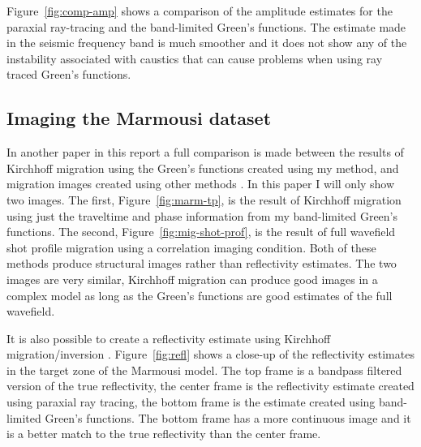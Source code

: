 
Figure~\ref{fig:comp-amp} shows a comparison of the amplitude estimates
for the paraxial ray-tracing and the band-limited Green's functions.
The estimate made in the seismic frequency band is much smoother and
it does not show any of the instability associated with caustics that
can cause problems when using ray traced Green's functions.


\subsection{Imaging the Marmousi dataset}

In another paper in this report a full comparison is made between the
results of Kirchhoff migration using the Green's functions created
using my method, and migration images created using other methods
\cite{Audebert.sep.80.mig3d2}. In this paper I will only show two
images. The first, Figure~\ref{fig:marm-tp}, is the result of Kirchhoff
migration using just the traveltime and phase information from my
band-limited Green's functions. The second,
Figure~\ref{fig:mig-shot-prof}, is the result of full wavefield shot
profile migration using a correlation imaging condition. Both of
these methods produce structural images rather than reflectivity
estimates. The two images are very similar, Kirchhoff migration can
produce good images in a complex model as long as the Green's
functions are good estimates of the full wavefield.

It is also possible to create a reflectivity estimate using Kirchhoff
migration/inversion \cite{Lumley.sep.70.165}.  Figure~\ref{fig:refl}
shows a close-up of the reflectivity estimates in the target zone of
the Marmousi model. The top frame is a bandpass filtered version of
the true reflectivity, the center frame is the reflectivity estimate
created using paraxial ray tracing, the bottom frame is the estimate
created using band-limited Green's functions. The bottom frame has a
more continuous image and it is a better match to the true
reflectivity than the center frame.


